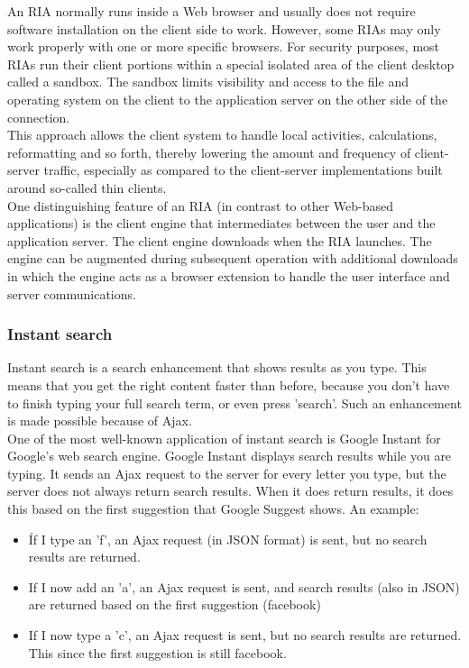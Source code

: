 An RIA normally runs inside a Web browser and usually does not require software installation on the client side to work. However, some RIAs may only work properly with one or more specific browsers. For security purposes, most RIAs run their client portions within a special isolated area of the client desktop called a sandbox. The sandbox limits visibility and access to the file and operating system on the client to the application server on the other side of the connection.\\
 
This approach allows the client system to handle local activities, calculations, reformatting and so forth, thereby lowering the amount and frequency of client-server traffic, especially as compared to the client-server implementations built around so-called thin clients.\\
 
One distinguishing feature of an RIA (in contrast to other Web-based applications) is the client engine that intermediates between the user and the application server. The client engine downloads when the RIA launches. The engine can be augmented during subsequent operation with additional downloads in which the engine acts as a browser extension to handle the user interface and server communications. \\
		
\subsubsection{Instant search}
Instant search is a search enhancement that shows results as you type. This means that you get the right content faster than before, because you don't have to finish typing your full search term, or even press 'search'. Such an enhancement is made possible because of Ajax.\\
	
One of the most well-known application of instant search is Google Instant for Google's web search engine. Google Instant displays search results while you are typing. It sends an Ajax request to the server for every letter you type, but the server does not always return search results. When it does return results, it does this based on the first suggestion that Google Suggest shows. An example:
\begin{itemize}
	\setlength\itemsep{0em}
	\item Íf I type an 'f', an Ajax request (in JSON format) is sent, but no search results are returned.
	\item If I now add an 'a', an Ajax request is sent, and search results (also in JSON) are returned based on the first suggestion (facebook)
	\item If I now type a 'c', an Ajax request is sent, but no search results are returned. This since the first suggestion is still facebook.
\end{itemize}
	
